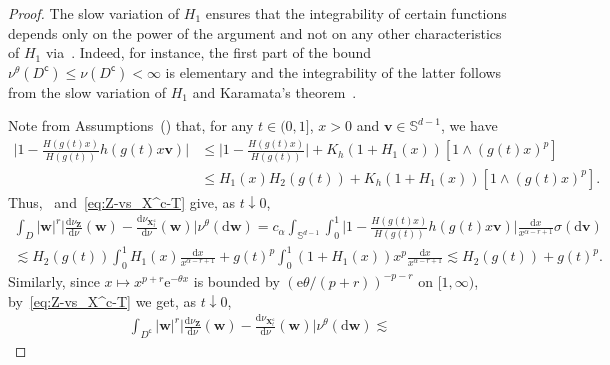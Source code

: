 \documentclass[en,oneside,bbfont,article]{amsart}
\theoremstyle{remark}
\theoremstyle{definition}
\theoremstyle{definition}
\newcommand\Sp{\mathbb{S}}
\newcommand\e{\mathord{\mathrm{e}}}
\newcommand\1{\mathds{1}}
\newcommand\da{\downarrow}
\renewcommand\le{\leqslant}
\newcommand\co{\mathsf{c}}
\newcommand{\D}{\mathrm{d}}
\begin{document}
\begin{proof}
The slow variation of $H_1$ ensures that the integrability of certain functions depends only on the power of the argument and not on any other characteristics of $H_1$ via~\cite[Prop.~1.5.10]{MR1015093}. Indeed, for instance, the first part of the bound $\nu^\theta(D^\co)\le \nu(D^\co)<\infty$ is elementary and the integrability of the latter follows from the slow variation of $H_1$ and Karamata's theorem~\cite[Thm~1.5.11]{MR1015093}. 

Note from Assumptions~() that, for any $t\in(0,1]$, $x>0$ and $\bm{v}\in\Sp^{d-1}$, we have
\begin{equation}
\label{eq:Z-vs_X^c-T}
\begin{split}
\bigg|1-\frac{H(g(t)x)}{H(g(t))}h(g(t)x\bm{v})\bigg|
&\le\bigg|1-\frac{H(g(t)x)}{H(g(t))}\bigg|
+K_h(1+H_1(x))[1\wedge (g(t)x)^p]\\
&\le
H_1(x) H_2(g(t))
+K_h (1+H_1(x)) [1\wedge (g(t)x)^p].
\end{split}
\end{equation}
Thus,~\cite[Prop.~1.5.10]{MR1015093} and~\eqref{eq:Z-vs_X^c-T} give, as $t\da 0$,
\begin{multline*}
\int_{D} |\bm{w}|^r\bigg|\frac{\D\nu_{\bm{Z}}}{\D\nu}(\bm{w})-\frac{\D\nu_{\bm{X}_t^\co}}{\D\nu}(\bm{w})\bigg| \nu^\theta(\D\bm{w})
=c_\alpha\int_{\Sp^{d-1}}\int_0^1 \bigg|1-\frac{H(g(t)x)}{H(g(t))}h(g(t)x\bm{v})\bigg|\frac{\D x}{x^{\alpha-r+1}}\sigma(\D \bm{v})\\
\lesssim 
H_2(g(t))\int_0^1H_1(x)\frac{\D x}{x^{\alpha-r+1}}
+g(t)^p \int_0^{1} (1+H_1(x))x^p \frac{\D x}{x^{\alpha-r+1}}
\lesssim H_2(g(t))+g(t)^p.
\end{multline*} 
Similarly, since $x\mapsto x^{p+r}\e^{-\theta x}$ is bounded by $(\e\theta/(p+r))^{-p-r}$ on $[1,\infty)$, by~\eqref{eq:Z-vs_X^c-T} we get, as $t\da 0$, 
\begin{multline*}
\int_{D^\co} |\bm{w}|^r\bigg|\frac{\D\nu_{\bm{Z}}}{\D\nu}(\bm{w})-\frac{\D\nu_{\bm{X}_t^\co}}{\D\nu}(\bm{w})\bigg| \nu^\theta(\D\bm{w})
\lesssim

\end{multline*}
\end{proof}
\end{document}
